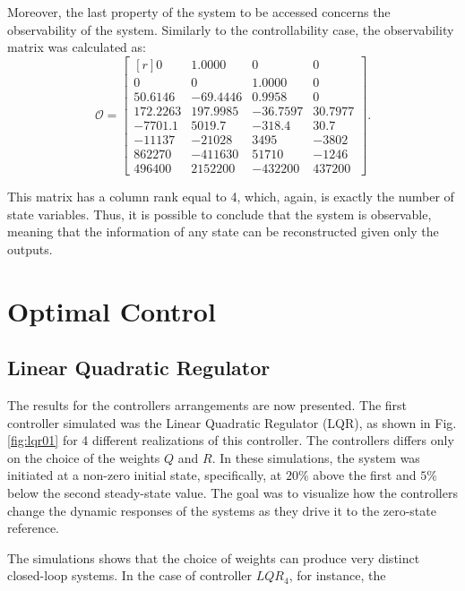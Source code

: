 \documentclass[a4paper,11pt]{book}
\numberwithin{figure}{chapter}
\numberwithin{equation}{chapter}
\numberwithin{table}{chapter}
\theoremstyle{definition}
\begin{document}
Moreover, the last property of the system to be accessed concerns the observability of the system. Similarly to the controllability case, the observability matrix was calculated as:
\begin{equation}
	\bm{\mathcal{O}} = \begin{bmatrix*}[r]
         0 &   1.0000 &        0  &       0 \\	
         0 &        0 &   1.0000  &       0 \\ 
   50.6146 & -69.4446 &   0.9958  &       0 \\
  172.2263 & 197.9985 & -36.7597  & 30.7977 \\
   -7701.1 &   5019.7 &  -318.4  &  30.7 \\
   -11137 &  -21028 &   3495 &  -3802 \\
   862270  & -411630  &  51710  & -1246 \\
   496400  &  2152200 &  -432200  &  437200
	\end{bmatrix*}
.\end{equation}

\noindent This matrix has a column rank equal to 4, which, again, is exactly the number of state variables. Thus, it is possible to conclude that the system is observable, meaning that the information of any state can be reconstructed given only the outputs. 

\section{Optimal Control}

\subsection{Linear Quadratic Regulator}

The results for the controllers arrangements are now presented. The first controller simulated was the Linear Quadratic Regulator (LQR), as shown in Fig. \ref{fig:lqr01} for 4 different realizations of this controller. The controllers differs only on the choice of the weights $Q$ and $R$. In these simulations, the system was initiated at a non-zero initial state, specifically, at $20\%$ above the first and $5\%$ below the second steady-state value. The goal was to visualize how the controllers change the dynamic responses of the systems as they drive it to the zero-state reference. 

The simulations shows that the choice of weights can produce very distinct closed-loop systems. In the case of controller $LQR_4$, for instance, the 
\end{document}
